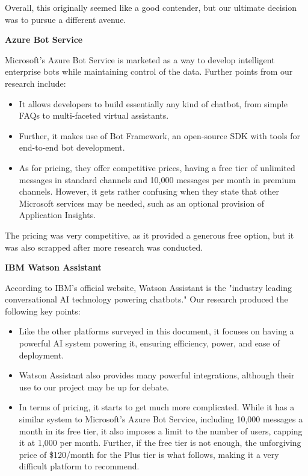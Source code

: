 \documentclass[titlepage, 12pt]{article}
\begin{document}
Overall, this originally seemed like a good contender, but our ultimate decision was to pursue a different avenue.

\textbf{Azure Bot Service}

Microsoft's Azure Bot Service is marketed as a way to develop intelligent enterprise bots while maintaining control of the data. Further points from our research include:

\begin{itemize}
    \item It allows developers to build essentially any kind of chatbot, from simple FAQs to multi-faceted virtual assistants.
    \item Further, it makes use of Bot Framework, an open-source SDK with tools for end-to-end bot development.
    \item As for pricing, they offer competitive prices, having a free tier of unlimited messages in standard channels and 10,000 messages per month in premium channels. However, it gets rather confusing when they state that other Microsoft services may be needed, such as an optional provision of Application Insights.
\end{itemize}

The pricing was very competitive, as it provided a generous free option, but it was also scrapped after more research was conducted.

\textbf{IBM Watson Assistant}

According to IBM's official website, Watson Assistant is the "industry leading conversational AI technology powering chatbots." Our research produced the following key points:

\begin{itemize}
    \item Like the other platforms surveyed in this document, it focuses on having a powerful AI system powering it, ensuring efficiency, power, and ease of deployment.
    \item Watson Assistant also provides many powerful integrations, although their use to our project may be up for debate.
    \item In terms of pricing, it starts to get much more complicated. While it has a similar system to Microsoft's Azure Bot Service, including 10,000 messages a month in its free tier, it also imposes a limit to the number of users, capping it at 1,000 per month. Further, if the free tier is not enough, the unforgiving price of \$120/month for the Plus tier is what follows, making it a very difficult platform to recommend.
\end{itemize}
\end{document}
